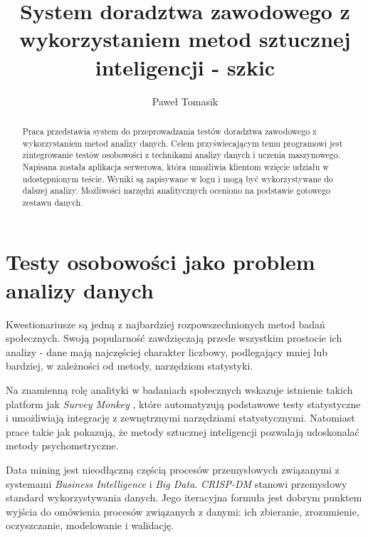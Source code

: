 \documentclass[12pt,a4paper,oneside]{report} %
\title{System doradztwa zawodowego z wykorzystaniem metod sztucznej inteligencji - szkic}
\author{Paweł Tomasik}
\begin{document}
\maketitle
\renewcommand{\abstractname}{Strzeszczenie}
\begin{abstract}
Praca przedstawia system do przeprowadzania testów doradztwa zawodowego z wykorzystaniem metod analizy danych. Celem przyświecającym temu programowi jest zintegrowanie testów osobowości z technikami analizy danych i uczenia maszynowego. Napisana została aplikacja serwerowa, która umożliwia klientom wzięcie udziału w udostępnionym teście. Wyniki są zapisywane w logu i mogą być wykorzystywane do dalszej analizy. Możliwości narzędzi analitycznych oceniono na podstawie gotowego zestawu danych.
\end{abstract}

\tableofcontents











\chapter{Testy osobowości jako problem analizy danych}

Kwestionariusze są jedną z najbardziej rozpowszechnionych metod badań społecznych. Swoją popularność zawdzięczają przede wszystkim prostocie ich analizy - dane mają najczęściej charakter liczbowy, podlegający mniej lub bardziej, w zależności od metody, narzędziom statystyki.\par

Na znamienną rolę analityki w badaniach społecznych wskazuje istnienie takich platform jak \emph{Survey Monkey} \cite{surveymonkey}, które automatyzują podstawowe testy statystyczne i umożliwiają integrację z zewnętrznymi narzędziami statystycznymi. Natomiast prace takie jak \cite{test-postaw-milosnych} pokazują, że metody sztucznej inteligencji pozwalają udoskonalać metody psychometryczne.\par

Data mining jest nieodłączną częścią procesów przemysłowych związanymi z systemami \emph{Business Intelligence} i \emph{Big Data}. \emph{CRISP-DM} stanowi przemysłowy standard wykorzystywania danych. Jego iteracyjna formuła jest dobrym punktem wyjścia do omówienia procesów związanych z danymi: ich zbieranie, zrozumienie, oczyszczanie, modelowanie i walidację.\par
\end{document}
